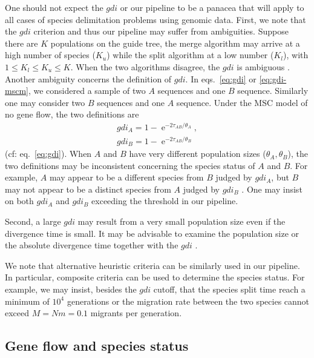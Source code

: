 \documentclass{article1}
\DeclareMathOperator{\e}{\mathrm{e}}
\begin{document}
One should not expect the $gdi$ or our pipeline to be a panacea that will apply to all
cases of species delimitation problems using genomic data. First, we note that the $gdi$
criterion and thus our pipeline may suffer from ambiguities.  Suppose there are $K$
populations on the guide tree, the merge algorithm may arrive at a high number of
species ($K_u$) while the split algorithm at a low number ($K_l$), with $1 \le K_l \le
K_u \le K$.  When the two algorithms disagree, the $gdi$ is ambiguous
\citep{Jackson2017}.   Another ambiguity concerns the definition of $gdi$.  In
eqs.~\ref{eq:gdi} or \ref{eq:gdi-mscm}, we considered a sample of two $A$ sequences and
one $B$ sequence.  Similarly one may consider two $B$ sequences and one $A$ sequence.
Under the MSC model of no gene flow, the two definitions are
\begin{equation}
   \begin{aligned}
      gdi_A = 1 - \e^{-2\tau _{AB}/\theta_A} , \\
      gdi_B = 1 - \e^{-2\tau _{AB}/\theta_B}
   \end{aligned}
\end{equation}
(cf: eq.~\ref{eq:gdi}).  When $A$ and $B$ have very different population sizes
($\theta_A, \theta_B$), the two definitions may be inconsistent concerning the species
status of $A$ and $B$.  For example, $A$ may appear to be a different species from $B$
judged by $gdi_A$, but $B$ may not appear to be a distinct species from $A$ judged by
$gdi_B$ \citep{Leache2019}.  One may insist on both $gdi_A$ and $gdi_B$ exceeding the
threshold in our pipeline.

Second, a large $gdi$ may result from a very small population size even if the
divergence time is small.  It may be advisable to examine the population size or the
absolute divergence time together with the $gdi$ \citep{Rannala2020}.

We note that alternative heuristic criteria can be similarly used in our pipeline.  In
particular, composite criteria can be used to determine the species status.  For
example, we may insist, besides the $gdi$ cutoff, that the species split time reach a
minimum of $10^4$ generations \citep{Rannala2020} or the migration rate between the two
species cannot exceed $M = Nm = 0.1$ migrants per generation.

\subsection{Gene flow and species status}
\end{document}
